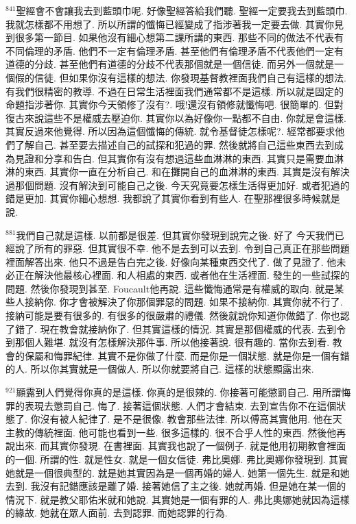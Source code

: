 \documentclass{book}
\begin{document}
$^{841}$聖經會不會讓我去到藍頭巾呢.
好像聖經答給我們聽.
聖經一定要我去到藍頭巾.
我就怎樣都不用想了.
所以所謂的懺悔已經變成了指涉著我一定要去做.
其實你見到很多第一節目.
如果他沒有細心想第二課所講的東西.
那些不同的做法不代表有不同倫理的矛盾.
他們不一定有倫理矛盾.
甚至他們有倫理矛盾不代表他們一定有道德的分歧.
甚至他們有道德的分歧不代表那個就是一個信徒.
而另外一個就是一個假的信徒.
但如果你沒有這樣的想法.
你發現基督教裡面我們自己有這樣的想法.
有我們很精密的教導.
不過在日常生活裡面我們通常都不是這樣.
所以就是固定的命題指涉著你.
其實你今天領修了沒有?.
哦!還沒有領修就懺悔吧.
很簡單的.
但對復古來說這些不是權威去壓迫你.
其實你以為好像你一點都不自由.
你就是會這樣.
其實反過來他覺得.
所以因為這個懺悔的傳統.
就令基督徒怎樣呢?.
經常都要求他們了解自己.
甚至要去描述自己的試探和犯過的罪.
然後就將自己這些東西去到成為見證和分享和告白.
但其實你有沒有想過這些血淋淋的東西.
其實只是需要血淋淋的東西.
其實你一直在分析自己.
和在攤開自己的血淋淋的東西.
其實是沒有解決過那個問題.
沒有解決到可能自己之後.
今天究竟要怎樣生活得更加好.
或者犯過的錯是更加.
其實你細心想想.
我都說了其實你看到有些人.
在聖那裡很多時候就是說.

$^{881}$我們自己就是這樣.
以前都是很差.
但其實你發現到說完之後.
好了 今天我們已經說了所有的罪惡.
但其實很不幸.
他不是去到可以去到.
令到自己真正在那些問題裡面解答出來.
他只不過是告白完之後.
好像向某種東西交代了.
做了見證了.
他未必正在解決他最核心裡面.
和人相處的東西.
或者他在生活裡面.
發生的一些試探的問題.
然後你發現到甚至.
Foucault他再說.
這些懺悔通常是有權威的取向.
就是某些人接納你.
你才會被解決了你那個罪惡的問題.
如果不接納你.
其實你就不行了.
接納可能是要有很多的.
有很多的很嚴肅的禮儀.
然後就說你知道你做錯了.
你也認了錯了.
現在教會就接納你了.
但其實這樣的情況.
其實是那個權威的代表.
去到令到那個人難堪.
就沒有怎樣解決那件事.
所以他接著說.
很有趣的.
當你去到看.
教會的保屬和悔罪紀律.
其實不是你做了什麼.
而是你是一個狀態.
就是你是一個有錯的人.
所以你其實就是一個做人.
所以你就要將自己.
這樣的狀態顯露出來.

$^{921}$顯露到人們覺得你真的是這樣.
你真的是很辣的.
你接著可能懲罰自己.
用所謂悔罪的表現去懲罰自己.
悔了.
接著這個狀態.
人們才會結束.
去到宣告你不在這個狀態了.
你沒有被人紀律了.
是不是很像.
教會那些法律.
所以傅高其實他用.
他在天主教的傳統裡面.
他可能也看到一些.
很多這樣的.
很不合乎人性的東西.
然後他再說出來.
而其實你發現.
在書裡面.
其實我也說了一個例子.
就是他用初期教會裡面的一個.
所謂的性.
就是性女.
就是一個女信徒.
弗比奧娜.
弗比奧娜你發現到.
其實她就是一個很典型的.
就是她其實因為是一個再婚的婦人.
她第一個先生.
就是和她去到.
我沒有記錯應該是離了婚.
接著她信了主之後.
她就再婚.
但是她在某一個的情況下.
就是教父耶佑米就和她說.
其實她是一個有罪的人.
弗比奧娜她就因為這樣的緣故.
她就在眾人面前.
去到認罪.
而她認罪的行為.
\end{document}
